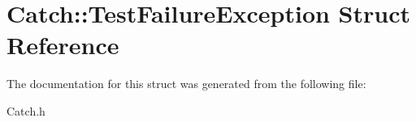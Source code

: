 \hypertarget{struct_catch_1_1_test_failure_exception}{\section{Catch\-:\-:Test\-Failure\-Exception Struct Reference}
\label{struct_catch_1_1_test_failure_exception}
}


The documentation for this struct was generated from the following file\-:\begin{DoxyCompactItemize}
\item 
Catch.\-h\end{DoxyCompactItemize}
